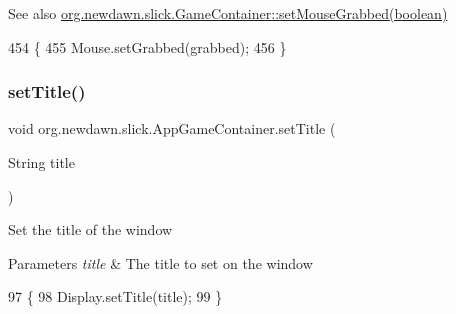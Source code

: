 \begin{DoxySeeAlso}{See also}
\mbox{\hyperlink{classorg_1_1newdawn_1_1slick_1_1_game_container_aaefa09c4a1a2d83a1e2e44a9c6972030}{org.\+newdawn.\+slick.\+Game\+Container\+::set\+Mouse\+Grabbed(boolean)}} 
\end{DoxySeeAlso}

\begin{DoxyCode}
454                                                  \{
455         Mouse.setGrabbed(grabbed);
456     \}
\end{DoxyCode}
\mbox{\label{classorg_1_1newdawn_1_1slick_1_1_app_game_container_a30cf85efc7ab454fd889cbc63d83a43e}} 
\subsubsection{\texorpdfstring{set\+Title()}{setTitle()}}
{\footnotesize\ttfamily void org.\+newdawn.\+slick.\+App\+Game\+Container.\+set\+Title (\begin{DoxyParamCaption}\item[{String}]{title }\end{DoxyParamCaption})\hspace{0.3cm}{\ttfamily [inline]}}

Set the title of the window


\begin{DoxyParams}{Parameters}
{\em title} & The title to set on the window \\
\hline
\end{DoxyParams}

\begin{DoxyCode}
97                                        \{
98         Display.setTitle(title);
99     \}
\end{DoxyCode}
\mbox{\label{classorg_1_1newdawn_1_1slick_1_1_app_game_container_ac2c97110363892113b435cc8aa5b0d4a}} 
